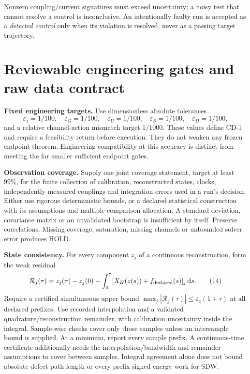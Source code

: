 \documentclass[10pt,a4paper]{article}
\newcommand{\dd}{\mathrm d}
\begin{document}
Nonzero coupling/current signatures must exceed uncertainty; a noisy test that cannot resolve a control is inconclusive. An intentionally faulty run is accepted as a \emph{detected control} only when its violation is resolved, never as a passing target trajectory.

\newpage
\section{Reviewable engineering gates and raw data contract}
\textbf{Fixed engineering targets.} Use dimensionless absolute tolerances
\[
\varepsilon_z=1/100,\quad \varepsilon_G=1/100,\quad
\varepsilon_U=1/100,\quad\varepsilon_S=1/100,
\quad\varepsilon_H=1/100,
\]
and a relative channel-action mismatch target $1/1000$. These values define CD-1 and require a feasibility return before execution. They do not weaken any frozen endpoint theorem. Engineering compatibility at this accuracy is distinct from meeting the far smaller sufficient endpoint gates.

\textbf{Observation coverage.} Supply one joint coverage statement, target at least $99\%$, for the finite collection of calibration, reconstructed states, clocks, independently measured couplings and integration errors used in a run's decision. Either use rigorous deterministic bounds, or a declared statistical construction with its assumptions and multiple-comparison allocation. A standard deviation, covariance matrix or an unvalidated bootstrap is insufficient by itself. Preserve correlations. Missing coverage, saturation, missing channels or unbounded solver error produces HOLD.

\textbf{State consistency.} For every component $z_j$ of a continuous reconstruction, form the weak residual
\[
\mathcal R_j(\tau)=z_j(\tau)-z_j(0)
-\int_0^\tau [X_H(z(s))+f_{\rm declared}(s)]_j\,\dd s.
\tag{14}
\]
Require a certified simultaneous upper bound $\max_j|\mathcal R_j(\tau)|\le\varepsilon_z(1+\tau)$ at all declared prefixes. Use recorded interpolation and a validated quadrature/reconstruction remainder, with calibration uncertainty inside the integral. Sample-wise checks cover only those samples unless an intersample bound is supplied. At a minimum, report every sample prefix. A continuous-time certificate additionally needs the interpolation/bandwidth and remainder assumptions to cover between samples. Integral agreement alone does not bound absolute defect path length or every-prefix signed energy work for SDW.
\end{document}
